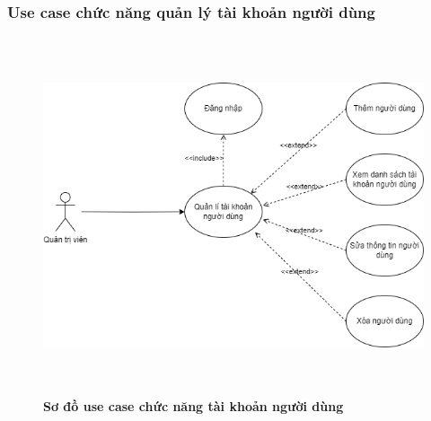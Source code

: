 \subsubsection{Use case chức năng quản lý tài khoản người dùng}
  \begin{figure}[H]
    \centering
    \includegraphics[width=15cm,height=10.5cm]{Images/use_case/use_case_manage_users.png}
    \caption[Sơ đồ use case chức năng tài khoản người dùng]{\bfseries \fontsize{12pt}{0pt}
    \selectfont Sơ đồ use case chức năng tài khoản người dùng}
    \label{use_case_user_management} %
  \end{figure}

